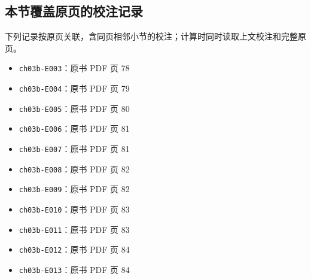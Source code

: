 \documentclass[
  10pt,
  fontset=fandol]{ctexart}
\providecommand{\tightlist}{%
  \setlength{\itemsep}{0pt}\setlength{\parskip}{0pt}}
\begin{document}
\subsection{本节覆盖原页的校注记录}\label{ux672cux8282ux8986ux76d6ux539fux9875ux7684ux6821ux6ce8ux8bb0ux5f55}

下列记录按原页关联，含同页相邻小节的校注；计算时同时读取上文校注和完整原页。

\begin{itemize}
\tightlist
\item
  \texttt{ch03b-E003}：原书 PDF 页 78
\item
  \texttt{ch03b-E004}：原书 PDF 页 79
\item
  \texttt{ch03b-E005}：原书 PDF 页 80
\item
  \texttt{ch03b-E006}：原书 PDF 页 81
\item
  \texttt{ch03b-E007}：原书 PDF 页 81
\item
  \texttt{ch03b-E008}：原书 PDF 页 82
\item
  \texttt{ch03b-E009}：原书 PDF 页 82
\item
  \texttt{ch03b-E010}：原书 PDF 页 83
\item
  \texttt{ch03b-E011}：原书 PDF 页 83
\item
  \texttt{ch03b-E012}：原书 PDF 页 84
\item
  \texttt{ch03b-E013}：原书 PDF 页 84
\end{itemize}
\end{document}
